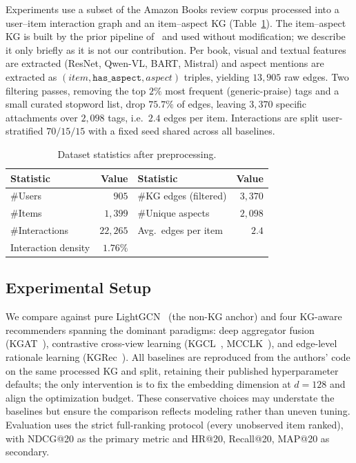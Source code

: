 \documentclass[12pt,a4paper]{article}
\begin{document}
Experiments use a subset of the Amazon Books review corpus processed into a user--item interaction graph and an item--aspect KG (Table~\ref{tab:data}). The item--aspect KG is built by the prior pipeline of~\cite{ho2024reviewkg} and used without modification; we describe it only briefly as it is not our contribution. Per book, visual and textual features are extracted (ResNet, Qwen-VL, BART, Mistral) and aspect mentions are extracted as $(\textit{item},\texttt{has\_aspect},\textit{aspect})$ triples, yielding $13{,}905$ raw edges. Two filtering passes, removing the top $2\%$ most frequent (generic-praise) tags and a small curated stopword list, drop $75.7\%$ of edges, leaving $3{,}370$ specific attachments over $2{,}098$ tags, i.e.\ $2.4$ edges per item. Interactions are split user-stratified $70/15/15$ with a fixed seed shared across all baselines.

\begin{table}[!ht]
\centering
\caption{Dataset statistics after preprocessing.}
\label{tab:data}
\small
\begin{tabular}{lr@{\hskip 2.5em}lr}
\toprule
Statistic & Value & Statistic & Value \\
\midrule
\#Users        & $905$    & \#KG edges (filtered) & $3{,}370$ \\
\#Items        & $1{,}399$ & \#Unique aspects      & $2{,}098$ \\
\#Interactions & $22{,}265$ & Avg.\ edges per item & $2.4$ \\
Interaction density & $1.76\%$ & & \\
\bottomrule
\end{tabular}
\end{table}

\subsection{Experimental Setup}

We compare against pure LightGCN~\cite{he2020lightgcn} (the non-KG anchor) and four KG-aware recommenders spanning the dominant paradigms: deep aggregator fusion (KGAT~\cite{wang2019kgat}), contrastive cross-view learning (KGCL~\cite{yang2022kgcl}, MCCLK~\cite{zou2022mcclk}), and edge-level rationale learning (KGRec~\cite{yang2023kgrec}). All baselines are reproduced from the authors' code on the same processed KG and split, retaining their published hyperparameter defaults; the only intervention is to fix the embedding dimension at $d{=}128$ and align the optimization budget. These conservative choices may understate the baselines but ensure the comparison reflects modeling rather than uneven tuning. Evaluation uses the strict full-ranking protocol (every unobserved item ranked), with NDCG@20 as the primary metric and HR@20, Recall@20, MAP@20 as secondary.
\end{document}

